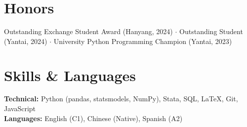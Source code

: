\documentclass[9.5pt, letterpaper]{article}
\begin{document}
\section*{Honors}

\small
Outstanding Exchange Student Award (Hanyang, 2024)
\;$\cdot$\;
Outstanding Student (Yantai, 2024)
\;$\cdot$\;
University Python Programming Champion (Yantai, 2023)

\section*{Skills \& Languages}

\small
\textbf{Technical:} Python (pandas, statsmodels, NumPy), Stata, SQL, \LaTeX, Git, JavaScript\\[3pt]
\textbf{Languages:} English (C1), Chinese (Native), Spanish (A2)
\end{document}
